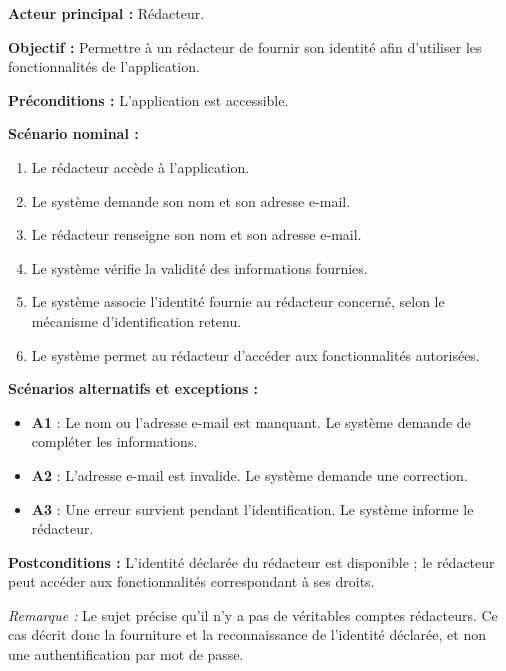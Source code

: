 \begin{description}[leftmargin=0pt, style=nextline, font=\normalfont\bfseries\color{violetprincipal}]

    \item[UC01 --- S'identifier]

    \textbf{Acteur principal :} Rédacteur.

    \textbf{Objectif :} Permettre à un rédacteur de fournir son identité afin d'utiliser les fonctionnalités de l'application.

    \textbf{Préconditions :} L'application est accessible.

    \textbf{Scénario nominal :}
    \begin{enumerate}
        \item Le rédacteur accède à l'application.
        \item Le système demande son nom et son adresse e-mail.
        \item Le rédacteur renseigne son nom et son adresse e-mail.
        \item Le système vérifie la validité des informations fournies.
        \item Le système associe l'identité fournie au rédacteur concerné, selon le mécanisme d'identification retenu.
        \item Le système permet au rédacteur d'accéder aux fonctionnalités autorisées.
    \end{enumerate}

    \textbf{Scénarios alternatifs et exceptions :}
    \begin{itemize}
        \item \textbf{A1} : Le nom ou l'adresse e-mail est manquant. Le système demande de compléter les informations.
        \item \textbf{A2} : L'adresse e-mail est invalide. Le système demande une correction.
        \item \textbf{A3} : Une erreur survient pendant l'identification. Le système informe le rédacteur.
    \end{itemize}

    \textbf{Postconditions :} L'identité déclarée du rédacteur est disponible ; le rédacteur peut accéder aux fonctionnalités correspondant à ses droits.

    \textit{Remarque :} Le sujet précise qu'il n'y a pas de véritables comptes rédacteurs. Ce cas décrit donc la fourniture et la reconnaissance de l'identité déclarée, et non une authentification par mot de passe.


\end{description}
